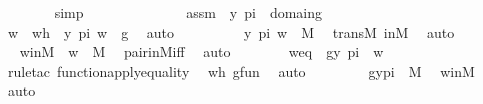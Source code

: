 \begin{isabellebody}
\ \ \ \ \ \ \isamarkupfalse%
\ simp\ \isanewline
\ \ \ \isamarkupfalse%
\ {\isacharminus}{\kern0pt}\ \isanewline
\ \ \ \ \ \isamarkupfalse%
\ assm\ {\isacharcolon}{\kern0pt}\ {\isachardoublequoteopen}{\isasymlangle}y{\isacharcomma}{\kern0pt}\ pi{\isasymrangle}\ {\isasymin}\ domain{\isacharparenleft}{\kern0pt}g{\isacharparenright}{\kern0pt}{\isachardoublequoteclose}\ \isanewline
\ \ \ \ \ \isamarkupfalse%
\ \isamarkupfalse%
\ w\ \ wh\ {\isacharcolon}{\kern0pt}\ {\isachardoublequoteopen}{\isacharless}{\kern0pt}{\isacharless}{\kern0pt}y{\isacharcomma}{\kern0pt}\ pi{\isachargreater}{\kern0pt}{\isacharcomma}{\kern0pt}\ w{\isachargreater}{\kern0pt}\ {\isasymin}\ g{\isachardoublequoteclose}\ \isamarkupfalse%
\ auto\ \isanewline
\ \ \ \ \ \isamarkupfalse%
\ \isamarkupfalse%
\ {\isachardoublequoteopen}{\isacharless}{\kern0pt}{\isacharless}{\kern0pt}y{\isacharcomma}{\kern0pt}\ pi{\isachargreater}{\kern0pt}{\isacharcomma}{\kern0pt}\ w{\isachargreater}{\kern0pt}\ {\isasymin}\ M{\isachardoublequoteclose}\ \isamarkupfalse%
\ transM\ inM\ \isamarkupfalse%
\ auto\isanewline
\ \ \ \ \ \isamarkupfalse%
\ \isamarkupfalse%
\ winM\ {\isacharcolon}{\kern0pt}\ {\isachardoublequoteopen}w\ {\isasymin}\ M{\isachardoublequoteclose}\ \isamarkupfalse%
\ pair{\isacharunderscore}{\kern0pt}in{\isacharunderscore}{\kern0pt}M{\isacharunderscore}{\kern0pt}iff\ \isamarkupfalse%
\ auto\ \isanewline
\ \ \ \ \ \isamarkupfalse%
\ weq\ {\isacharcolon}{\kern0pt}\ {\isachardoublequoteopen}g{\isacharbackquote}{\kern0pt}{\isacharless}{\kern0pt}y{\isacharcomma}{\kern0pt}\ pi{\isachargreater}{\kern0pt}\ {\isacharequal}{\kern0pt}\ w{\isachardoublequoteclose}\ \isamarkupfalse%
\ {\isacharparenleft}{\kern0pt}rule{\isacharunderscore}{\kern0pt}tac\ function{\isacharunderscore}{\kern0pt}apply{\isacharunderscore}{\kern0pt}equality{\isacharparenright}{\kern0pt}\ \isamarkupfalse%
\ wh\ gfun\ \isamarkupfalse%
\ auto\isanewline
\ \ \ \ \ \isamarkupfalse%
\ \isamarkupfalse%
\ {\isachardoublequoteopen}g{\isacharbackquote}{\kern0pt}{\isacharless}{\kern0pt}y{\isacharcomma}{\kern0pt}pi{\isachargreater}{\kern0pt}\ {\isasymin}\ M{\isachardoublequoteclose}\ \isamarkupfalse%
\ winM\ \isamarkupfalse%
\ auto\isanewline
\ \ \ \ \ \isamarkupfalse%

\end{isabellebody}
